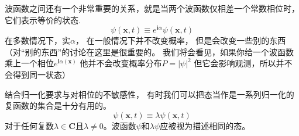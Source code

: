 波函数之间还有一个非常重要的关系，就是当两个波函数仅相差一个常数相位时，它们表示等价的状态.
\[
    \psi(\mathbf{x},t)\equiv e^{\mathbf{i}\alpha}\psi(\mathbf{x},t)
\]
 在多数情况下，实$\alpha$， 在一般情况下并不改变概率， 但是会改变一些别的东西（对“别的东西”的讨论在这里是很重要的。 我们将会看见，如果你给一个波函数乘上一个相位$e^{\mathbf{i}\alpha(\mathbf{x})}$  他并不会改变概率分布$P = |\psi|^2$ 但它会影响观测，所以并不会得到同一状态）\par
结合归一化要求与对相位的不敏感性， 有时我们可以把态当作是一系列归一化的复函数的集合是十分有用的。
\[
    \psi(\mathbf{x},t)\equiv\lambda \psi(\mathbf{x},t)
\]
对于任何复数$\lambda \in \mathbf{C}$且$\lambda \ne 0$。波函数$\psi$和$\lambda \psi$应被视为描述相同的态。